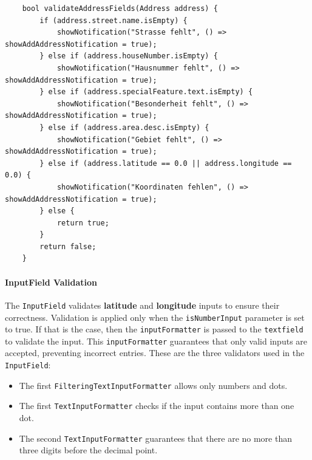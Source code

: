 \lstset{style=mycsharp, caption=InputFormatter in Inputfield}
\begin{lstlisting}
    bool validateAddressFields(Address address) {
        if (address.street.name.isEmpty) {
            showNotification("Strasse fehlt", () => showAddAddressNotification = true);
        } else if (address.houseNumber.isEmpty) {
            showNotification("Hausnummer fehlt", () => showAddAddressNotification = true);
        } else if (address.specialFeature.text.isEmpty) {
            showNotification("Besonderheit fehlt", () => showAddAddressNotification = true);
        } else if (address.area.desc.isEmpty) {
            showNotification("Gebiet fehlt", () => showAddAddressNotification = true);
        } else if (address.latitude == 0.0 || address.longitude == 0.0) {
            showNotification("Koordinaten fehlen", () => showAddAddressNotification = true);
        } else {
            return true;
        }
        return false;
    }
\end{lstlisting}


\paragraph{InputField Validation}
The \texttt{InputField} validates \textbf{latitude} and \textbf{longitude} inputs to ensure their correctness. Validation is applied only when the \texttt{isNumberInput} parameter is set to true. If that is the case, then the \texttt{inputFormatter} is passed to the \texttt{textfield} to validate the input. This \texttt{inputFormatter} guarantees that only valid inputs are accepted, preventing incorrect entries. These are the three validators used in the \texttt{InputField}:

\begin{itemize}
    \item The first \texttt{FilteringTextInputFormatter} allows only numbers and dots.
    \item The first \texttt{TextInputFormatter} checks if the input contains more than one dot.
    \item The second \texttt{TextInputFormatter} guarantees that there are no more than three digits before the decimal point.
\end{itemize}

